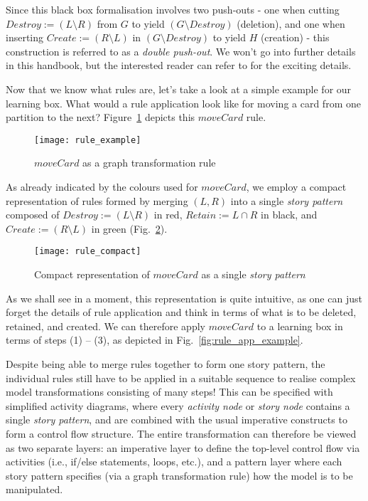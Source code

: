 Since this black box formalisation involves two push-outs - one when cutting $Destroy := (L\setminus R)$ from $G$ to yield $(G\setminus Destroy)$ (deletion),
and one when inserting $Create := (R\setminus L)$ in $(G\setminus Destroy)$ to yield $H$ (creation) - this construction is referred to as a \emph{double
push-out}. We won't go into further details in this handbook, but the interested reader can refer to \cite{EEPT06} for the exciting details.

Now that we know what rules are, let's take a look at a simple example for our learning box. What would a rule application look like for moving a card from
one partition to the next? Figure~\ref{fig:rule_example} depicts this $moveCard$ rule.
  
\begin{figure}[htp]
\begin{center}
  \texttt{[image: rule\_example]}
  \caption[]{$moveCard$ as a graph transformation rule}	
  \label{fig:rule_example}
\end{center}
\end{figure}


As already indicated by the colours used for $moveCard$, we employ a compact representation of rules formed by merging $(L,R)$ into a single \emph{story
pattern} composed of  $Destroy := (L\setminus R)$ in red, $Retain :=  L\cap R$ in black, and $Create := (R\setminus L)$ in green
(Fig.~\ref{fig:rule_compact}).

\begin{figure}[htp]
\begin{center}
  \texttt{[image: rule\_compact]}
  \caption[]{Compact representation of $moveCard$ as a single \emph{story pattern}}
  \label{fig:rule_compact}
\end{center}
\end{figure}

As we shall see in a moment, this  representation is quite intuitive, as one can just forget the details of rule application and think in terms of what is to be
deleted, retained, and created. We can therefore apply $moveCard$ to a learning box in terms of steps (1) -- (3), as depicted in Fig.~\ref{fig:rule_app_example}.

Despite being able to merge rules together to form one story pattern, the individual rules still have to be applied in a suitable sequence to realise complex
model transformations consisting of many steps! This can be specified with simplified activity diagrams, where every \emph{activity node}
or \emph{story node} contains a single \emph{story pattern}, and are combined with the usual imperative constructs to form a control flow structure. The entire
transformation can therefore be viewed as two separate layers: an imperative layer to define the top-level control flow via activities (i.e., if/else
statements, loops, etc.), and a pattern layer where each story pattern specifies (via a graph transformation rule) how the model is to be manipulated.

